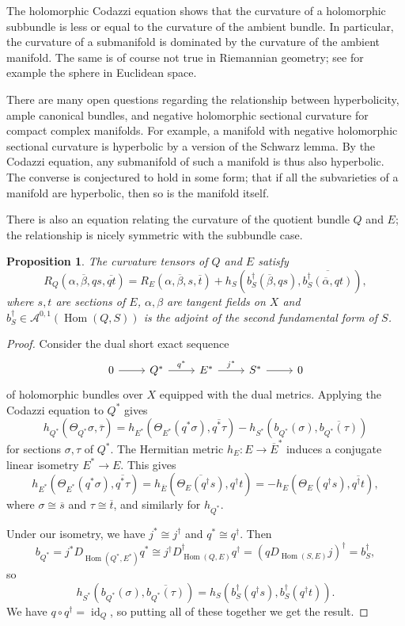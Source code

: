 \documentclass[10pt,a4paper]{article}
\newtheorem{prop}[theo]{Proposition}
\newtheorem*{proof}{Proof}
\newcommand{\cc}[1]{\mathcal{#1}}
\def\ov#1{\overline{#1}}
\DeclareMathOperator{\Hom}{Hom}
\DeclareMathOperator{\id}{id}
\begin{document}
The holomorphic Codazzi equation shows that the curvature of a holomorphic subbundle is less or equal to the curvature of the ambient bundle. In particular, the curvature of a submanifold is dominated by the curvature of the ambient manifold. The same is of course not true in Riemannian geometry; see for example the sphere in Euclidean space.

There are many open questions regarding the relationship between hyperbolicity, ample canonical bundles, and negative holomorphic sectional curvature for compact complex manifolds. For example, a manifold with negative holomorphic sectional curvature is hyperbolic by a version of the Schwarz lemma. By the Codazzi equation, any submanifold of such a manifold is thus also hyperbolic. The converse is conjectured to hold in some form; that if all the subvarieties of a manifold are hyperbolic, then so is the manifold itself.

There is also an equation relating the curvature of the quotient bundle $Q$ and $E$; the relationship is nicely symmetric with the subbundle case.

\begin{prop}
The curvature tensors of $Q$ and $E$ satisfy
\[
R_Q(\alpha,\ov\beta,q s, \ov{q t})
= R_{E}(\alpha,\ov\beta,s,\ov t)
+ h_S(b_S^\dagger(\ov\beta,q s),\ov{ b_S^\dagger(\ov\alpha,q t)}),
\]
where $s, t$ are sections of $E$, $\alpha,\beta$ are tangent fields on
$X$ and $b_S^\dagger \in \cc A^{0,1}(\Hom(Q,S))$ is the adjoint of the second
fundamental form of $S$.
\end{prop}

\begin{proof}
Consider the dual short exact sequence
\[
\begin{tikzcd}
0 \arrow[r] & Q^* \arrow[r,"q^*"] & E^* \arrow[r,"j^*"]  & S^* \arrow[r] & 0
\end{tikzcd}
\]
of holomorphic bundles over $X$ equipped with the dual metrics.
Applying the Codazzi equation to $Q^*$ gives
$$
h_{Q^*}(\Theta_{Q^*} \sigma, \ov \tau)
= h_{E^*}(\Theta_{E^*} (q^* \sigma),\ov{ q^* \tau})
- h_{S^*}(b_{Q^*}(\sigma), \ov{b_{Q^*}(\tau)})
$$
for sections $\sigma,\tau$ of $Q^*$. The Hermitian metric $h_E : E \to \ov E^*$ induces a conjugate linear isometry $E^* \to E$. This gives
\[
h_{E^*}(\Theta_{E^*} (q^* \sigma),\ov{ q^* \tau})
= h_{\ov E}(\ov{\Theta_{E} (q^\dagger s)}, q^\dagger t)
= -h_{E}(\Theta_{E} (q^\dagger s), \ov{q^\dagger t}),
\]
where $\sigma \cong \ov s$ and $\tau \cong \ov t$,
and similarly for $h_{Q^*}$.

Under our isometry, we have $j^* \cong j^\dagger$ and $q^* \cong q^\dagger$. Then
\[
b_{Q^*}
= j^*D_{\Hom(Q^*,E^*)}q^*
\cong j^\dagger D_{\Hom(Q,E)}^\dagger q^\dagger
= (q D_{\Hom(S,E)} j)^\dagger
= b_S^\dagger,
\]
so
\[
h_{S^*}(b_{Q^*}(\sigma), \ov{b_{Q^*}(\tau)})
= h_{S}(b_S^\dagger(q^\dagger s), b_S^\dagger(q^\dagger t)).
\]
We have $q \circ q^\dagger = \id_Q$, so putting all of these together we get the result.
\end{proof}
\end{document}
